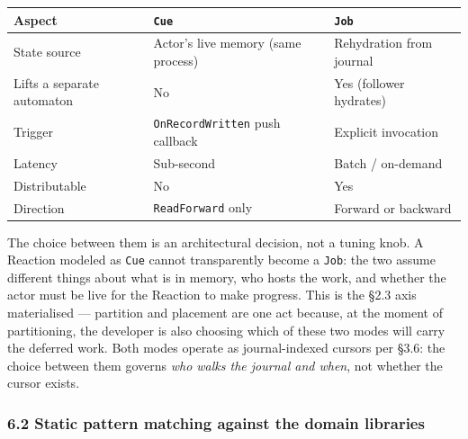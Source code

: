 \documentclass[
]{article}
\newcounter{none} %
\let\origtexttt\texttt%
\renewcommand{\texttt}[1]{\origtexttt{\seqsplit{#1}}}%
\let\texttt\origtexttt%
\begin{document}
{\def\LTcaptype{none} %
\begin{longtable}[]{@{}
  >{\raggedright\arraybackslash}p{}
  >{\raggedright\arraybackslash}p{}
  >{\raggedright\arraybackslash}p{}@{}}
\toprule\noalign{}
\begin{minipage}[b]{\linewidth}\raggedright
Aspect
\end{minipage} & \begin{minipage}[b]{\linewidth}\raggedright
\texttt{Cue}
\end{minipage} & \begin{minipage}[b]{\linewidth}\raggedright
\texttt{Job}
\end{minipage} \\
\midrule\noalign{}
\endhead
\bottomrule\noalign{}
\endlastfoot
State source & Actor's live memory (same process) & Rehydration from
journal \\
Lifts a separate automaton & No & Yes (follower hydrates) \\
Trigger & \texttt{OnRecordWritten} push callback & Explicit
invocation \\
Latency & Sub-second & Batch / on-demand \\
Distributable & No & Yes \\
Direction & \texttt{ReadForward} only & Forward or backward \\
\end{longtable}
}

The choice between them is an architectural decision, not a tuning knob.
A Reaction modeled as \texttt{Cue} cannot transparently become a
\texttt{Job}: the two assume different things about what is in memory,
who hosts the work, and whether the actor must be live for the Reaction
to make progress. This is the §2.3 axis materialised --- partition and
placement are one act because, at the moment of partitioning, the
developer is also choosing which of these two modes will carry the
deferred work. Both modes operate as journal-indexed cursors per §3.6:
the choice between them governs \emph{who walks the journal and when},
not whether the cursor exists.

\subsubsection{6.2 Static pattern matching against the domain
libraries}\label{static-pattern-matching-against-the-domain-libraries}
\end{document}
